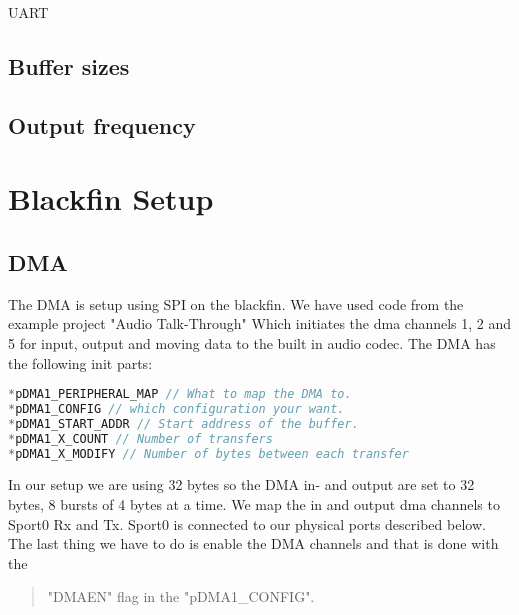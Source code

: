 UART\\
\subsection{Buffer sizes}

\subsection{Output frequency}
\section{Blackfin Setup}
\subsection{DMA}
The DMA is setup using SPI on the blackfin. We have used code from the example project "Audio Talk-Through" Which initiates the dma channels 1, 2 and 5 for input, output and moving data to the built in audio codec. The DMA has the following init parts:
\begin{lstlisting}[language=C]
*pDMA1_PERIPHERAL_MAP // What to map the DMA to.
*pDMA1_CONFIG // which configuration your want.
*pDMA1_START_ADDR // Start address of the buffer.
*pDMA1_X_COUNT // Number of transfers
*pDMA1_X_MODIFY // Number of bytes between each transfer
\end{lstlisting}
In our setup we are using 32 bytes so the DMA in- and output are set to 32 bytes, 8 bursts of 4 bytes at a time. We map the in and output dma channels to Sport0 Rx and Tx. Sport0 is connected to our physical ports described below. The last thing we have to do is enable the DMA channels and that is done with the \begin{quote}
"DMAEN" flag in the "pDMA1\_CONFIG".
\end{quote}
